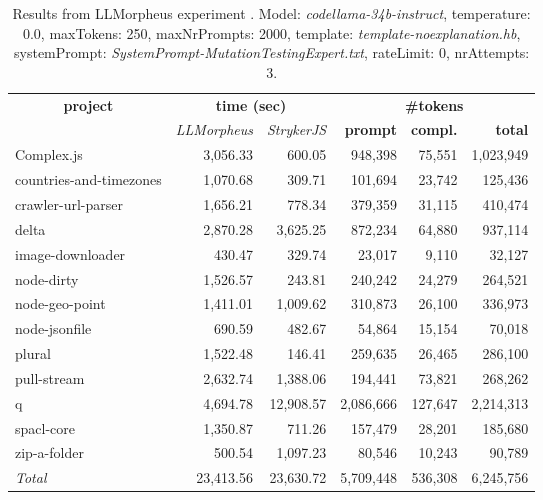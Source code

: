 
\begin{table*}[hbt!]
\centering
{\scriptsize
\begin{tabular}{l||r|r|r|r|r}
\multicolumn{1}{c|}{\bf project} & \multicolumn{2}{|c|}{\bf time (sec)} & \multicolumn{3}{|c|}{\bf \#tokens} \\
               & {\it LLMorpheus} & {\it StrykerJS} & {\bf prompt} & {\bf compl.} & {\bf total} \\
\hline
  Complex.js & 3,056.33 & 600.05 & 948,398 & 75,551 & 1,023,949 \\ 
countries-and-timezones & 1,070.68 & 309.71 & 101,694 & 23,742 & 125,436 \\ 
crawler-url-parser & 1,656.21 & 778.34 & 379,359 & 31,115 & 410,474 \\ 
delta & 2,870.28 & 3,625.25 & 872,234 & 64,880 & 937,114 \\ 
image-downloader & 430.47 & 329.74 & 23,017 & 9,110 & 32,127 \\ 
node-dirty & 1,526.57 & 243.81 & 240,242 & 24,279 & 264,521 \\ 
node-geo-point & 1,411.01 & 1,009.62 & 310,873 & 26,100 & 336,973 \\ 
node-jsonfile & 690.59 & 482.67 & 54,864 & 15,154 & 70,018 \\ 
plural & 1,522.48 & 146.41 & 259,635 & 26,465 & 286,100 \\ 
pull-stream & 2,632.74 & 1,388.06 & 194,441 & 73,821 & 268,262 \\ 
q & 4,694.78 & 12,908.57 & 2,086,666 & 127,647 & 2,214,313 \\ 
spacl-core & 1,350.87 & 711.26 & 157,479 & 28,201 & 185,680 \\ 
zip-a-folder & 500.54 & 1,097.23 & 80,546 & 10,243 & 90,789 \\ 
\hline
  \textit{Total} & 23,413.56 & 23,630.72 & 5,709,448 & 536,308 & 6,245,756 \\
  \end{tabular}
  }
  \\[2mm]
  \caption{Results from LLMorpheus experiment .
    Model: \textit{codellama-34b-instruct}, 
    temperature: 0.0, 
    maxTokens: 250, 
    maxNrPrompts: 2000, 
    template: \textit{template-noexplanation.hb}, 
    systemPrompt: \textit{SystemPrompt-MutationTestingExpert.txt}, 
    rateLimit: 0, 
    nrAttempts: 3.  
  }
  \label{table:Cost:run372:codellama-34b-instruct:template-noexplanation.hb:0.0}
\end{table*}